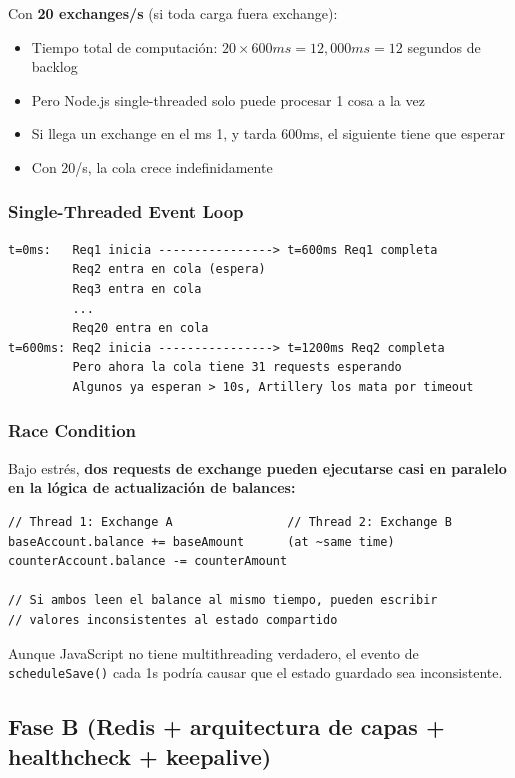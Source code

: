Con \textbf{20 exchanges/s} (si toda carga fuera exchange):
\begin{itemize}
    \item Tiempo total de computación: $20 \times 600ms = 12,000ms = 12$ segundos de backlog
    \item Pero Node.js single-threaded solo puede procesar 1 cosa a la vez
    \item Si llega un exchange en el ms 1, y tarda 600ms, el siguiente tiene que esperar
    \item Con 20/s, la cola crece indefinidamente
\end{itemize}

\subsubsection{Single-Threaded Event Loop}
\begin{verbatim}
t=0ms:   Req1 inicia ----------------> t=600ms Req1 completa
         Req2 entra en cola (espera)
         Req3 entra en cola
         ...
         Req20 entra en cola
t=600ms: Req2 inicia ----------------> t=1200ms Req2 completa
         Pero ahora la cola tiene 31 requests esperando
         Algunos ya esperan > 10s, Artillery los mata por timeout
\end{verbatim}

\subsubsection{Race Condition}
Bajo estrés, \textbf{dos requests de exchange pueden ejecutarse casi en paralelo en la lógica de actualización de balances:}
\begin{verbatim}
// Thread 1: Exchange A                // Thread 2: Exchange B
baseAccount.balance += baseAmount      (at ~same time)
counterAccount.balance -= counterAmount

// Si ambos leen el balance al mismo tiempo, pueden escribir
// valores inconsistentes al estado compartido
\end{verbatim}
Aunque JavaScript no tiene multithreading verdadero, el evento de \texttt{scheduleSave()} cada 1s podría causar que el estado guardado sea inconsistente.



\subsection{Fase B (Redis + arquitectura de capas + healthcheck + keepalive)}

